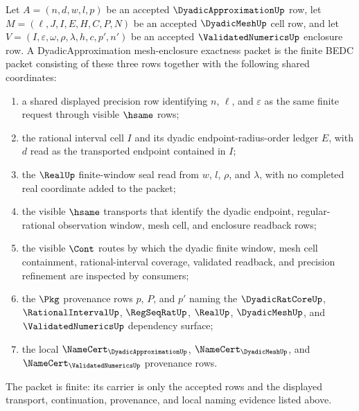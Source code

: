 \begin{definition}
\label{def:dyadicapproximation-mesh-enclosure-exactness-packet}
Let $A=(n,d,w,l,p)$ be an accepted $\DyadicApproximationUp$ row, let
$M=(\ell,J,I,E,H,C,P,N)$ be an accepted $\DyadicMeshUp$ cell row, and let
$V=(I,\varepsilon,\omega,\rho,\lambda,h,c,p',n')$ be an accepted
$\ValidatedNumericsUp$ enclosure row. A DyadicApproximation mesh-enclosure
exactness packet is the finite BEDC packet consisting of these three rows
together with the following shared coordinates:
\begin{enumerate}
\item a shared displayed precision row identifying $n$, $\ell$, and
$\varepsilon$ as the same finite request through visible $\hsame$ rows;
\item the rational interval cell $I$ and its dyadic endpoint-radius-order
ledger $E$, with $d$ read as the transported endpoint contained in $I$;
\item the $\RealUp$ finite-window seal read from $w$, $l$, $\rho$, and
$\lambda$, with no completed real coordinate added to the packet;
\item the visible $\hsame$ transports that identify the dyadic endpoint,
regular-rational observation window, mesh cell, and enclosure readback rows;
\item the visible $\Cont$ routes by which the dyadic finite window, mesh cell
containment, rational-interval coverage, validated readback, and precision
refinement are inspected by consumers;
\item the $\Pkg$ provenance rows $p$, $P$, and $p'$ naming the
$\DyadicRatCoreUp$, $\RationalIntervalUp$, $\RegSeqRatUp$, $\RealUp$,
$\DyadicMeshUp$, and $\ValidatedNumericsUp$ dependency surface;
\item the local $\NameCert_{\DyadicApproximationUp}$,
$\NameCert_{\DyadicMeshUp}$, and $\NameCert_{\ValidatedNumericsUp}$
provenance rows.
\end{enumerate}
The packet is finite: its carrier is only the accepted rows and the displayed
transport, continuation, provenance, and local naming evidence listed above.
\end{definition}

